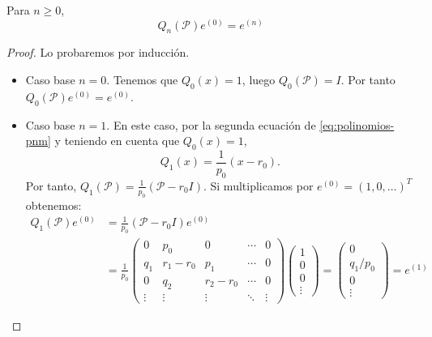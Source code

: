     \begin{proposicion}
        \label{prop:formula-e}
        Para $n\geq 0$,
        \begin{equation}
            Q_n(\mathcal{P})e^{(0)} = e^{(n)}
        \end{equation}
    \end{proposicion}
    \begin{proof}
        Lo probaremos por inducción.
        \begin{itemize}
            \item Caso base $n=0$. Tenemos que $Q_0(x)=1$, luego $Q_0(\mathcal{P})=I$. Por tanto $Q_0(\mathcal{P}) e^{(0)} = e^{(0)}$.
            \item Caso base $n=1$. En este caso, por la segunda ecuación de \eqref{eq:polinomios-pnm} y teniendo en cuenta que $Q_0(x)=1$,
            $$
            Q_1(x) = \frac{1}{p_0}(x-r_0).
            $$
            Por tanto, $Q_1(\mathcal{P}) = \frac{1}{p_0}(\mathcal{P}-r_0 I)$. Si multiplicamos por $e^{(0)}=(1,0,\dots)^T$ obtenemos:
            \begin{equation*}
                \begin{split}
                    Q_1(\mathcal{P})e^{(0)} &=  \frac{1}{p_0}(\mathcal{P}-r_0 I) e^{(0)} \\
                    &=  \frac{1}{p_0} \begin{pmatrix}
                        0 & p_0 & 0  & \cdots & 0 \\
                        q_1 & r_1-r_0 & p_1 & \cdots & 0 \\
                        0 & q_2 & r_2-r_0 & \cdots & 0 \\
                        \vdots & \vdots & \vdots &\ddots & \vdots
                    \end{pmatrix} \begin{pmatrix}
                        1 \\ 0 \\ 0 \\ \vdots 
                    \end{pmatrix} = \begin{pmatrix}
                        0 \\ q_1/p_0 \\ 0 \\ \vdots
                    \end{pmatrix}= e^{(1)}
                \end{split}
            \end{equation*}

\end{itemize}
\end{proof}

